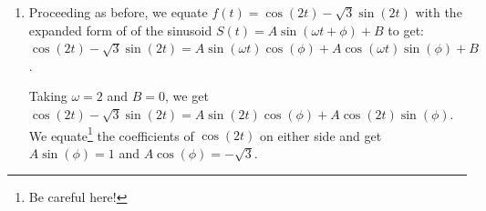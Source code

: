 \documentclass{ximera}
\begin{document}
\begin{example}
\begin{enumerate}
  
 
 As usual, our first task is to reduce this system of two equations and two unknowns to one equation and one unknown.  We can temporarily eliminate the dependence on $\phi$ by using a Pythagorean Identity.  From $\cos^{2}(\phi) + \sin^{2}(\phi) = 1$, we multiply through by $A^2$ to get  $A^2\cos^{2}(\phi) + A^2\sin^{2}(\phi) = A^2$.  
 
  
 
In our case,  $A \cos(\phi) = 1$ and $A \sin(\phi) = \sqrt{3}$, hence  $A^2 = A^2\cos^{2}(\phi) + A^2\sin^{2}(\phi) = 1^2 + (\sqrt{3})^2 = 4$ so $A = \pm 2$.  In much the same way we fit a sinusoid to a graph  in Example \ref{fitsinusoidtodata1}, we \textit{choose} $A = 2$, and then find the phase angle $\phi$ associated with this choice.


 

Substituting $A=2$ into our two equations,   $A \cos(\phi) = 1$ and $A \sin(\phi) = \sqrt{3}$, we get $2\cos(\phi) = 1$ and $2 \sin(\phi) = \sqrt{3}$.  After some rearrangement, $\cos(\phi) = \frac{1}{2}$ and $\sin(\phi) = \frac{\sqrt{3}}{2}$.  One such angle $\phi$ which satisfies this criteria is $\phi = \frac{\pi}{3}$.  

 

Hence, one way to write $f(t)$ as a sinusoid is  $f(t) = 2 \cos\left(2t + \frac{\pi}{3}\right)$.   We can check our answer using the sum formula for cosine :

 \[\begin{array}{rcl} f(t) &  = &  2 \cos\left(2t + \frac{\pi}{3}\right) \\   & = &  2 \left[ \cos(2t) \cos\left(\frac{\pi}{3}\right) - \sin(2t) \sin\left(\frac{\pi}{3}\right) \right]\\   & = & 2 \left[ \cos(2t) \left(\frac{1}{2}\right) - \sin(2t) \left(\frac{\sqrt{3}}{2}\right)\right] \\   & = & \cos(2t) - \sqrt{3} \sin(2t). \\ \end{array}\]

\item  Proceeding as before, we equate $f(t) = \cos(2t) - \sqrt{3} \sin(2t)$ with the expanded form of of the sinusoid $S(t) = A \sin(\omega t + \phi) + B$ to get:  $\cos(2t) - \sqrt{3} \sin(2t) = A\sin(\omega t) \cos(\phi) + A \cos(\omega t)\sin(\phi) + B$.

 

Taking $\omega = 2$ and $B = 0$, we get  $\cos(2t) - \sqrt{3} \sin(2t) =  A\sin(2t) \cos(\phi) + A \cos(2t)\sin(\phi)$.  We equate\footnote{Be careful here!} the coefficients of $\cos(2t)$ on either side and get $A\sin(\phi) = 1$ and $A\cos(\phi) = -\sqrt{3}$.  


\end{enumerate}
\end{example}
\end{document}
